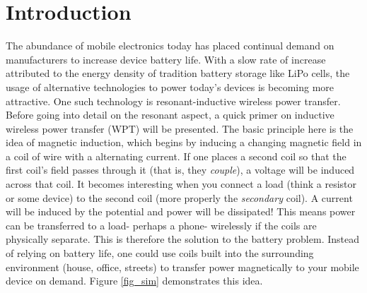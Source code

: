 \documentclass[11pt,letterpaper]{article}
\begin{document}
\section*{\large Introduction}
\noindent The abundance of mobile electronics today has placed continual demand on manufacturers to increase device battery life. With a slow rate of increase attributed to the energy density of tradition battery storage like LiPo cells, the usage of alternative technologies to power today's devices is becoming more attractive. One such technology is resonant-inductive wireless power transfer. Before going into detail on the resonant aspect, a quick primer on inductive wireless power transfer (WPT) will be presented. The basic principle here is the idea of magnetic induction, which begins by inducing a changing magnetic field in a coil of wire with a alternating current. If one places a second coil so that the first coil's field passes through it (that is, they \textit{couple}), a voltage will be induced across that coil. It becomes interesting when you connect a load (think a resistor or some device) to the second coil (more properly the \textit{secondary} coil). A current will be induced by the potential and power will be dissipated! This means power can be transferred to a load- perhaps a phone- wirelessly if the coils are physically separate. This is therefore the solution to the battery problem. Instead of relying on battery life, one could use coils built into the surrounding environment (house, office, streets) to transfer power magnetically to your mobile device on demand. Figure \ref{fig_sim} demonstrates this idea.
\end{document}
